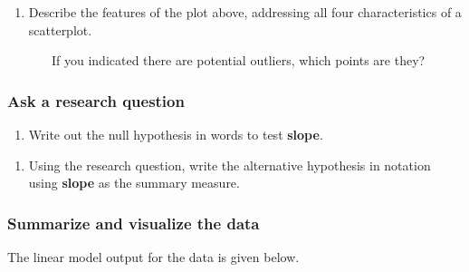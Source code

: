 \documentclass[
]{report}
\newenvironment{Shaded}{\begin{snugshade}}{\end{snugshade}}
\newcommand{\AttributeTok}[1]{\textcolor[rgb]{0.13,0.29,0.53}{#1}}
\newcommand{\CommentTok}[1]{\textcolor[rgb]{0.56,0.35,0.01}{\textit{#1}}}
\newcommand{\DecValTok}[1]{\textcolor[rgb]{0.00,0.00,0.81}{#1}}
\newcommand{\FunctionTok}[1]{\textcolor[rgb]{0.13,0.29,0.53}{\textbf{#1}}}
\newcommand{\NormalTok}[1]{#1}
\newcommand{\OtherTok}[1]{\textcolor[rgb]{0.56,0.35,0.01}{#1}}
\newcommand{\SpecialCharTok}[1]{\textcolor[rgb]{0.81,0.36,0.00}{\textbf{#1}}}
\providecommand{\tightlist}{%
  \setlength{\itemsep}{0pt}\setlength{\parskip}{0pt}}
\begin{document}
\begin{enumerate}
\def\labelenumi{\arabic{enumi}.}
\setcounter{enumi}{1}
\tightlist
\item
  Describe the features of the plot above, addressing all four characteristics of a scatterplot.
\end{enumerate}

\vspace{1in}

~~~~~~~If you indicated there are potential outliers, which points are they?

\vspace{0.5in}

\hypertarget{ask-a-research-question-4}{%
\subsubsection*{Ask a research question}\label{ask-a-research-question-4}}

\begin{enumerate}
\def\labelenumi{\arabic{enumi}.}
\setcounter{enumi}{2}
\tightlist
\item
  Write out the null hypothesis in words to test \textbf{slope}.
\end{enumerate}

\vspace{0.8in}

\begin{enumerate}
\def\labelenumi{\arabic{enumi}.}
\setcounter{enumi}{3}
\tightlist
\item
  Using the research question, write the alternative hypothesis in notation using \textbf{slope} as the summary measure.
\end{enumerate}

\vspace{0.5in}

\hypertarget{summarize-and-visualize-the-data-5}{%
\subsubsection*{Summarize and visualize the data}\label{summarize-and-visualize-the-data-5}}

The linear model output for the data is given below.

\begin{Shaded}
\end{Shaded}
\end{document}
